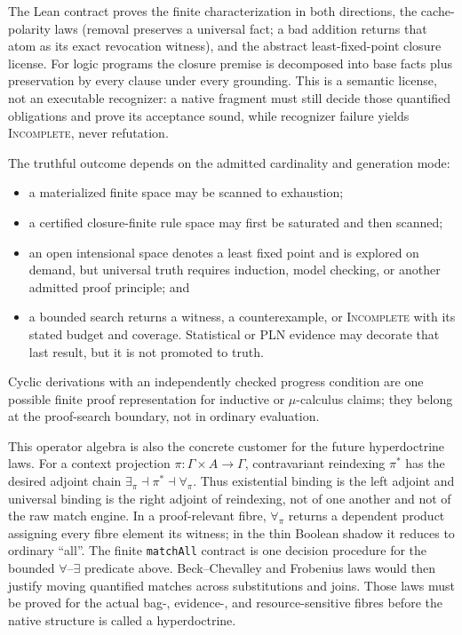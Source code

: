 \documentclass[11pt]{article}
\newcommand{\code}[1]{\texttt{#1}}
\begin{document}
The Lean contract proves the finite characterization in both directions, the
cache-polarity laws (removal preserves a universal fact; a bad addition returns
that atom as its exact revocation witness), and the abstract least-fixed-point
closure license.  For logic programs the closure premise is decomposed into base
facts plus preservation by every clause under every grounding.  This is a
semantic license, not an executable recognizer: a native fragment must still
decide those quantified obligations and prove its acceptance sound, while
recognizer failure yields \textsc{Incomplete}, never refutation.

The truthful outcome depends on the admitted cardinality and generation mode:
\begin{itemize}
\item a materialized finite space may be scanned to exhaustion;
\item a certified closure-finite rule space may first be saturated and then
  scanned;
\item an open intensional space denotes a least fixed point and is explored on
  demand, but universal truth requires induction, model checking, or another
  admitted proof principle; and
\item a bounded search returns a witness, a counterexample, or
  \textsc{Incomplete} with its stated budget and coverage.  Statistical or PLN
  evidence may decorate that last result, but it is not promoted to truth.
\end{itemize}
Cyclic derivations with an independently checked progress condition are one
possible finite proof representation for inductive or $\mu$-calculus claims;
they belong at the proof-search boundary, not in ordinary evaluation.

This operator algebra is also the concrete customer for the future
hyperdoctrine laws.  For a context projection
$\pi:\Gamma\mathbin{\times}A\to\Gamma$, contravariant reindexing
$\pi^*$ has the desired adjoint chain
$\exists_\pi\dashv\pi^*\dashv\forall_\pi$.  Thus existential binding is the
left adjoint and universal binding is the right adjoint of reindexing, not of
one another and not of the raw match engine.  In a proof-relevant fibre,
$\forall_\pi$ returns a dependent product assigning every fibre element its
witness; in the thin Boolean shadow it reduces to ordinary ``all''.  The finite
\code{matchAll} contract is one decision procedure for the bounded
$\forall$--$\exists$ predicate above.  Beck--Chevalley and Frobenius laws would then justify
moving quantified matches across substitutions and joins.  Those laws must be
proved for the actual bag-, evidence-, and resource-sensitive fibres before the
native structure is called a hyperdoctrine.
\end{document}
